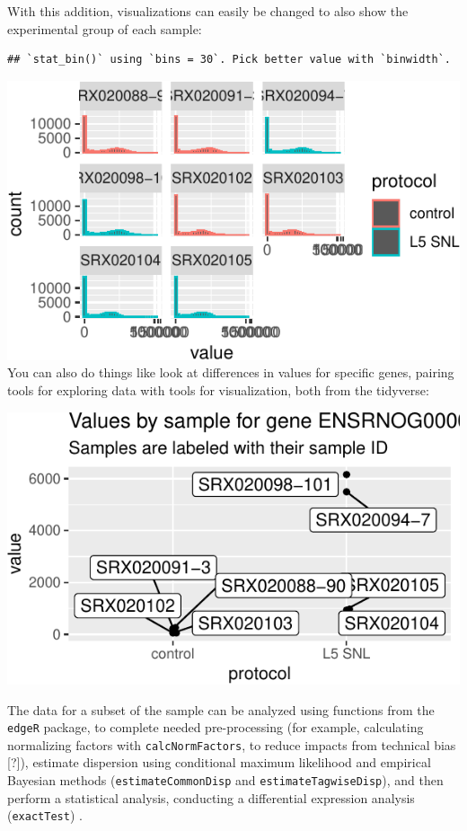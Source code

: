 \documentclass[]{tufte-book}
\begin{document}
With this addition, visualizations can easily be changed to also show the
experimental group of each sample:

\begin{verbatim}
## `stat_bin()` using `bins = 30`. Pick better value with `binwidth`.
\end{verbatim}

\includegraphics{improve_repro_files/figure-latex/unnamed-chunk-24-1}
You can also do things like look at differences in values for
specific genes, pairing tools for exploring data with tools for
visualization, both from the tidyverse:

\includegraphics{improve_repro_files/figure-latex/unnamed-chunk-25-1}

The data for a subset of the sample can be analyzed using functions from the
\texttt{edgeR} package, to complete needed pre-processing (for example, calculating
normalizing factors with \texttt{calcNormFactors}, to reduce impacts from technical
bias {[}?{]}), estimate dispersion using conditional maximum likelihood and
empirical Bayesian methods (\texttt{estimateCommonDisp} and \texttt{estimateTagwiseDisp}), and
then perform a statistical analysis, conducting a differential expression
analysis (\texttt{exactTest}) \citep{chen2014edger}.
\end{document}
